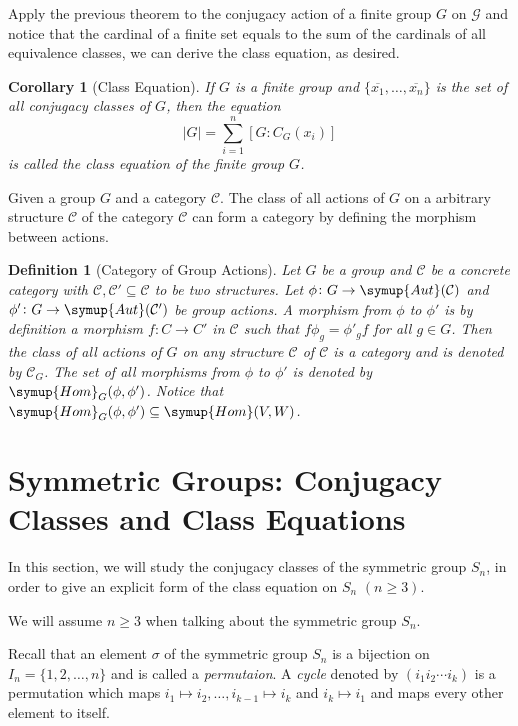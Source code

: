 \documentclass{assignment}[2019/10/15]
\theoremstyle{plain}
\newtheorem{definition}[theorem]{Definition}
\newtheorem{corollary}[theorem]{Corollary}
\newcommand{\Hom}{\mathop{}\!\symup{Hom}}
\newcommand{\Aut}{\mathop{}\!\symup{Aut}}
\numberwithin{equation}{section}
\begin{document}
    Apply the previous theorem to the conjugacy action of a finite group $G$ on $\mathcal{G}$ and notice that the cardinal of a finite set equals to the sum of the cardinals of all equivalence classes, we can derive the class equation, as desired.

    \begin{corollary}[Class Equation]
        If $G$ is a finite group and $\{\overline{x_1}, \dotsc, \overline{x_n}\}$ is the set of all conjugacy classes of $G$, then the equation
        \begin{equation}
            |G| = \sum_{i=1}^n[G: C_G(x_i)]
        \end{equation}
        is called the \emph{class equation} of the finite group $G$.
    \end{corollary}

    Given a group $G$ and a category $\mathscr{C}$. The class of all actions of $G$ on a arbitrary structure $\mathcal{C}$ of the category $\mathscr{C}$ can form a category by defining the morphism between actions.

    \begin{definition}[Category of Group Actions]
        Let $G$ be a group and $\mathscr{C}$ be a concrete category with $\mathcal{C}, \mathcal{C}'\subseteq \mathscr{C}$ to be two structures. Let $\phi\colon G\to \Aut(\mathcal{C})$ and $\phi'\colon G\to\Aut(\mathcal{C}')$ be group actions. A morphism from $\phi$ to $\phi'$ is by definition a morphism $f\colon C\to C'$ in $\mathscr{C}$ such that $f\phi_g = \phi'_gf$ for all $g\in G$. Then the class of all actions of $G$ on any structure $\mathcal{C}$ of $\mathscr{C}$ is a category and is denoted by $\mathscr{C}_G$. The set of all morphisms from $\phi$ to $\phi'$ is denoted by $\Hom_G(\phi, \phi')$. Notice that $\Hom_{G}(\phi, \phi')\subseteq \Hom(V, W)$.
    \end{definition}

    \section{Symmetric Groups: Conjugacy Classes and Class Equations}

    In this section, we will study the conjugacy classes of the symmetric group $S_n$, in order to give an explicit form of the class equation on $S_n$ $(n\geq 3)$.

    We will assume $n\geq 3$ when talking about the symmetric group $S_n$.

    Recall that an element $\sigma$ of the symmetric group $S_n$ is a bijection on $I_n = \{1, 2, \dotsc, n\}$ and is called a \emph{permutaion}.
    A \emph{cycle} denoted by $(i_1 i_2 \dotsb i_k)$ is a permutation which maps $i_1\mapsto i_2, \dotsc, i_{k-1}\mapsto i_k$ and $i_k\mapsto i_1$ and maps every other element to itself.
\end{document}
